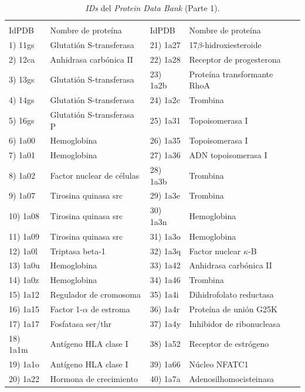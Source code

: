  	 \begin{table}[h!]
 	 	\centering
 	 	\begin{tabular}{ll|ll}
 	 		\multicolumn{4}{c}{} \\
 	 		IdPDB & Nombre de prote\'{i}na & IdPDB & Nombre de prote\'{i}na \\
 	 		\hline
 	 		1) 11gs & Glutatión S-transferasa & 21) 1a27 & 17$\beta$-hidroxiesteroide \\
 	 		2) 12ca & Anhidrasa carbónica II & 22) 1a28 & Receptor de progesterona \\
 	 		3) 13gs & Glutatión S-transferasa & 23) 1a2b & Proteína transformante RhoA \\
 	 		4) 14gs & Glutatión S-transferasa & 24) 1a2c & Trombina \\
 	 		5) 16gs & Glutatión S-transferasa P & 25) 1a31 & Topoisomerasa I \\
 	 		6) 1a00 & Hemoglobina & 26) 1a35 & Topoisomerasa I \\
 	 		7) 1a01 & Hemoglobina & 27) 1a36 & ADN topoisomerasa I \\
 	 		8) 1a02 & Factor nuclear de células & 28) 1a3b & Trombina \\
 	 		9) 1a07 & Tirosina quinasa src & 29) 1a3e & Trombina \\
 	 		10) 1a08 & Tirosina quinasa src & 30) 1a3n & Hemoglobina \\
 	 		11) 1a09 & Tirosina quinasa src & 31) 1a3o & Hemoglobina \\
 	 		12) 1a0l & Triptasa beta-1 & 32) 1a3q & Factor nuclear $\kappa$-B\\
 	 		13) 1a0u & Hemoglobina & 33) 1a42 & Anhidrasa carbónica II \\
 	 		14) 1a0z & Hemoglobina & 34) 1a46 & Trombina \\
 	 		15) 1a12 & Regulador de cromosoma & 35) 1a4i & Dihidrofolato reductasa \\
 	 		16) 1a15 & Factor 1-$\alpha$ de estroma & 36) 1a4r & Proteína de unión G25K \\
 	 		17) 1a17 & Fosfatasa ser/thr & 37) 1a4y & Inhibidor de ribonucleasa \\
 	 		18) 1a1m & Antígeno  HLA clase I & 38) 1a52 & Receptor de estrógeno \\
 	 		19) 1a1o & Antígeno  HLA clase I & 39) 1a66 & Núcleo NFATC1 \\
 	 		20) 1a22 & Hormona de crecimiento & 40) 1a7a & Adenosilhomocisteinasa \\
 	 		\hline
 	 	\end{tabular}
 	 	\caption{\emph{IDs} del \emph{Protein Data Bank} (Parte 1).}
 	 	\label{Tabla:ids79(1)}
 	 \end{table}
 	 
